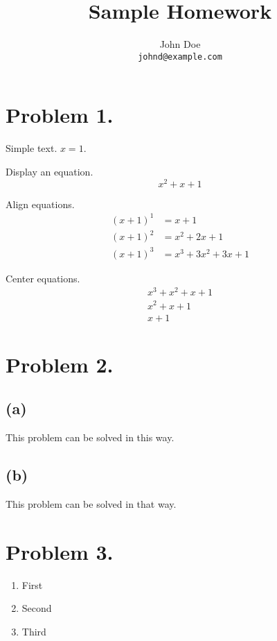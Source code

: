 \documentclass[a4paper,11pt]{article}
\begin{document}
\title{Sample Homework}
\author{John Doe \\ \texttt{johnd@example.com}}
\maketitle

\section*{Problem 1.}

Simple text. $x = 1$.

Display an equation.
\[
  x^2 + x + 1
\]

Align equations.
\begin{align*}
  {(x + 1)}^1 &= x + 1 \\
  {(x + 1)}^2 &= x^2 + 2x + 1 \\
  {(x + 1)}^3 &= x^3 + 3x^2 + 3x + 1
\end{align*}

Center equations.
\begin{gather*}
  x^3 + x^2 + x + 1 \\
  x^2 + x + 1 \\
  x + 1
\end{gather*}

\section*{Problem 2.}

\subsection*{(a)}

This problem can be solved in this way.

\subsection*{(b)}

This problem can be solved in that way.

\section*{Problem 3.}

\begin{enumerate}
  \item First

  \item Second

  \item Third
\end{enumerate}
\end{document}
